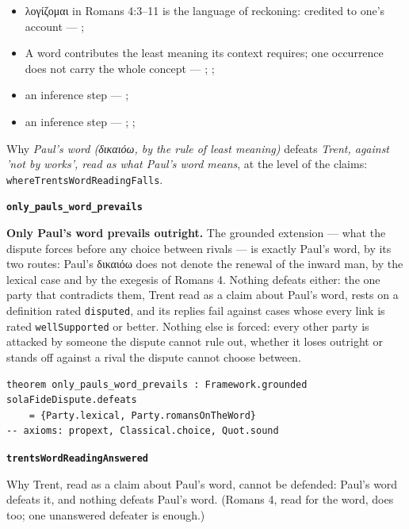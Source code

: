\documentclass[11pt]{article}
\begin{document}
\begin{itemize}
\begin{itemize}
\item λογίζομαι in Romans 4:3–11 is the language of reckoning: credited to one's account --- \cite[s.v. λογίζομαι]{bauer-danker-lexicon-2000}; \cite[ad loc. Rom 4:3]{moo-romans-1996}
\item A word contributes the least meaning its context requires; one occurrence does not carry the whole concept --- \cite{silva-biblical-words-1994}; \cite{joos-semantic-axiom-1972}; \cite{barr-semantics-2004}
\item an inference step --- \cite[ad loc. Rom 4:6]{moo-romans-1996}; \cite[s.v. λογίζομαι]{bauer-danker-lexicon-2000}
\item an inference step --- \cite{silva-biblical-words-1994}; \cite[p. 80]{moo-romans-1996}; \cite{barr-semantics-2004}
\end{itemize}
\end{itemize}
\noindent Why \emph{Paul's word (δικαιόω, by the rule of least meaning)} defeats \emph{Trent, against 'not by works', read as what Paul's word means}, at the level of the claims: \texttt{where\allowbreak{}Trents\allowbreak{}Word\allowbreak{}Reading\allowbreak{}Falls}.
\par\medskip\noindent\textbf{\texttt{only\_\allowbreak{}pauls\_\allowbreak{}word\_\allowbreak{}prevails}}\par\nobreak\noindent
\textbf{Only Paul's word prevails outright.} The grounded extension — what the dispute forces before any choice between rivals — is exactly Paul's word, by its two routes: Paul's δικαιόω does not denote the renewal of the inward man, by the lexical case and by the exegesis of Romans 4. Nothing defeats either: the one party that contradicts them, Trent read as a claim about Paul's word, rests on a definition rated \texttt{disputed}, and its replies fail against cases whose every link is rated \texttt{well\allowbreak{}Supported} or better. Nothing else is forced: every other party is attacked by someone the dispute cannot rule out, whether it loses outright or stands off against a rival the dispute cannot choose between.

{\small\begin{verbatim}
theorem only_pauls_word_prevails : Framework.grounded solaFideDispute.defeats
    = {Party.lexical, Party.romansOnTheWord}
-- axioms: propext, Classical.choice, Quot.sound
\end{verbatim}}
\par\medskip\noindent\textbf{\texttt{trents\allowbreak{}Word\allowbreak{}Reading\allowbreak{}Answered}}\par\nobreak\noindent
Why Trent, read as a claim about Paul's word, cannot be defended: Paul's word defeats it, and nothing defeats Paul's word. (Romans 4, read for the word, does too; one unanswered defeater is enough.)
\end{document}
